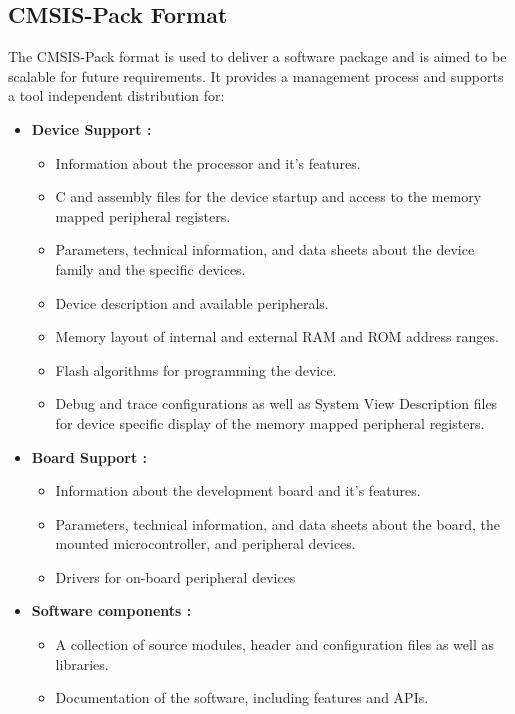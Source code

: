 \subsection{CMSIS-Pack Format}
The CMSIS-Pack format is used to deliver a software package and is aimed to be scalable for future requirements. It provides a management process and supports a tool independent distribution for:
\begin{itemize}
	\item \textbf{Device Support :}
	\begin{itemize}
		\item Information about the processor and it's features.
		\item C and assembly files for the device startup and access to the memory mapped peripheral registers.
		\item Parameters, technical information, and data sheets about the device family and the specific devices.
		\item Device description and available peripherals.
		\item Memory layout of internal and external RAM and ROM address ranges.
		\item Flash algorithms for programming the device.
		\item Debug and trace configurations as well as System View Description files for device specific display of the memory mapped peripheral registers. 
	\end{itemize}
	\item \textbf{Board Support :}
	\begin{itemize}
		\item Information about the development board and it's features.
		\item Parameters, technical information, and data sheets about the board, the mounted microcontroller, and peripheral devices.
		\item Drivers for on-board peripheral devices
	\end{itemize}
	\item \textbf{Software components :}
	\begin{itemize}
		\item A collection of source modules, header and configuration files as well as libraries.
		\item Documentation of the software, including features and APIs.
	\end{itemize}
\end{itemize}
